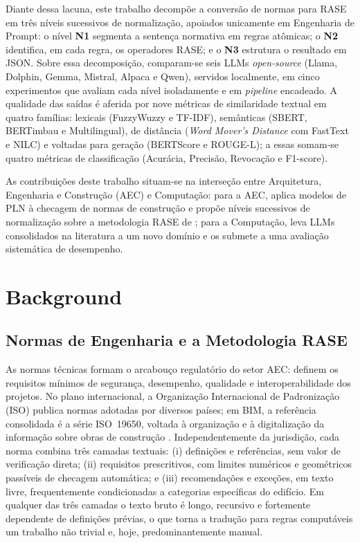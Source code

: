 \documentclass[a4paper,fleqn]{cas-sc}
\begin{document}
Diante dessa lacuna, este trabalho decompõe a conversão de normas para RASE em três níveis sucessivos de normalização, apoiados unicamente em Engenharia de Prompt: o nível \textbf{N1} segmenta a sentença normativa em regras atômicas; o \textbf{N2} identifica, em cada regra, os operadores RASE; e o \textbf{N3} estrutura o resultado em JSON. Sobre essa decomposição, comparam-se seis LLMs \textit{open-source} (Llama, Dolphin, Gemma, Mistral, Alpaca e Qwen), servidos localmente, em cinco experimentos que avaliam cada nível isoladamente e em \textit{pipeline} encadeado. A qualidade das saídas é aferida por nove métricas de similaridade textual em quatro famílias: lexicais (FuzzyWuzzy e TF-IDF), semânticas (SBERT, BERTimbau e Multilingual), de distância (\textit{Word Mover's Distance} com FastText e NILC) e voltadas para geração (BERTScore e ROUGE-L); a essas somam-se quatro métricas de classificação (Acurácia, Precisão, Revocação e F1-score).

As contribuições deste trabalho situam-se na interseção entre Arquitetura, Engenharia e Construção (AEC) e Computação: para a AEC, aplica modelos de PLN à checagem de normas de construção e propõe níveis sucessivos de normalização sobre a metodologia RASE de \citet{hjelseth2011}; para a Computação, leva LLMs consolidados na literatura a um novo domínio e os submete a uma avaliação sistemática de desempenho.

\section{Background}\label{sec:background}

\subsection{Normas de Engenharia e a Metodologia RASE}\label{sec:normas-rase}
As normas técnicas formam o arcabouço regulatório do setor AEC: definem os requisitos mínimos de segurança, desempenho, qualidade e interoperabilidade dos projetos. No plano internacional, a Organização Internacional de Padronização (ISO) publica normas adotadas por diversos países; em BIM, a referência consolidada é a série ISO~19650, voltada à organização e à digitalização da informação sobre obras de construção \citep{iso19650}. Independentemente da jurisdição, cada norma combina três camadas textuais: (i) definições e referências, sem valor de verificação direta; (ii) requisitos prescritivos, com limites numéricos e geométricos passíveis de checagem automática; e (iii) recomendações e exceções, em texto livre, frequentemente condicionadas a categorias específicas do edifício. Em qualquer das três camadas o texto bruto é longo, recursivo e fortemente dependente de definições prévias, o que torna a tradução para regras computáveis um trabalho não trivial e, hoje, predominantemente manual.
\end{document}
